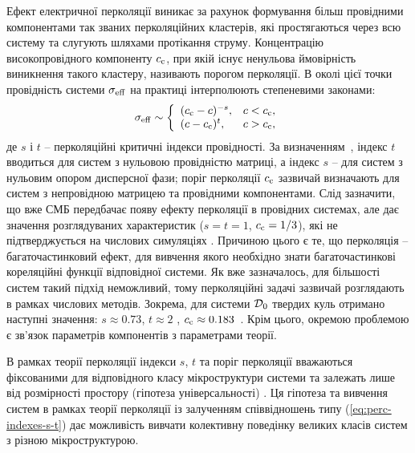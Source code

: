 \documentclass[14pt,twoside]{vakthesis}
\begin{document}
Ефект електричної перколяції виникає за рахунок формування більш провідними компонентами так званих перколяційних кластерів, які простягаються через всю систему та слугують шляхами протікання струму.
Концентрацію високопровідного компоненту $c_{\rm c}$, при якій існує ненульова ймовірність виникнення такого кластеру, називають порогом перколяції. В околі цієї точки провідність системи $\sigma_{\rm eff}$ на практиці інтерполюють степеневими законами:
\begin{equation}\label{eq:perc-indexes-s-t}
\sigma_{\rm eff} \sim \left\{ 
\begin{array}{ll}
(c_{\rm c} - c)^{-s}, & c< c_{\rm c},\\
(c - c_{\rm c})^t, & c> c_{\rm c},
\end{array}
\right.
\end{equation}
де $s$ і $t$ -- перколяційні критичні індекси провідності. За визначенням~\cite{Aharony,Torquato,Sahimi,Hunt}, індекс $t$ вводиться для систем з нульовою провідністю матриці, а індекс $s$ -- для систем з нульовим опором дисперсної фази; поріг перколяції $c_{\rm c}$ зазвичай визначають для систем з непровідною матрицею та провідними компонентами. Слід зазначити, що вже СМБ передбачає появу ефекту перколяції в провідних системах, але дає  значення розглядуваних характеристик ($s=t=1$, $c_{\rm c}=1/3$), які не підтверджується на числових симуляціях \cite{Kirkpatrick1973,Torquato,Aharony}. Причиною цього є те, що перколяція -- багаточастинковий ефект, для вивчення якого необхідно знати багаточастинкові кореляційні функції відповідної системи. Як вже зазначалось, для більшості систем такий підхід неможливий, тому перколяційні задачі зазвичай розглядають в рамках числових методів. Зокрема, для системи ${\cal D}_0$ твердих куль отримано наступні значення: $s\approx 0.73$, $t\approx 2$ \cite{Aharony}, $c_{\rm c} \approx 0.183$~\cite{Powel1979}.
Крім цього, окремою проблемою є зв'язок параметрів компонентів з параметрами теорії.

В рамках теорії перколяції індекси $s$, $t$ та поріг перколяції вважаються фіксованими для відповідного класу мікроструктури системи та залежать лише від розмірності простору (гіпотеза універсальності) \cite{Aharony,Torquato,Hunt}. 
Ця гіпотеза та вивчення систем в рамках теорії перколяції із залученням співвідношень типу (\ref{eq:perc-indexes-s-t}) дає можливість вивчати колективну поведінку великих класів  систем з різною мікроструктурою. 
\end{document}
